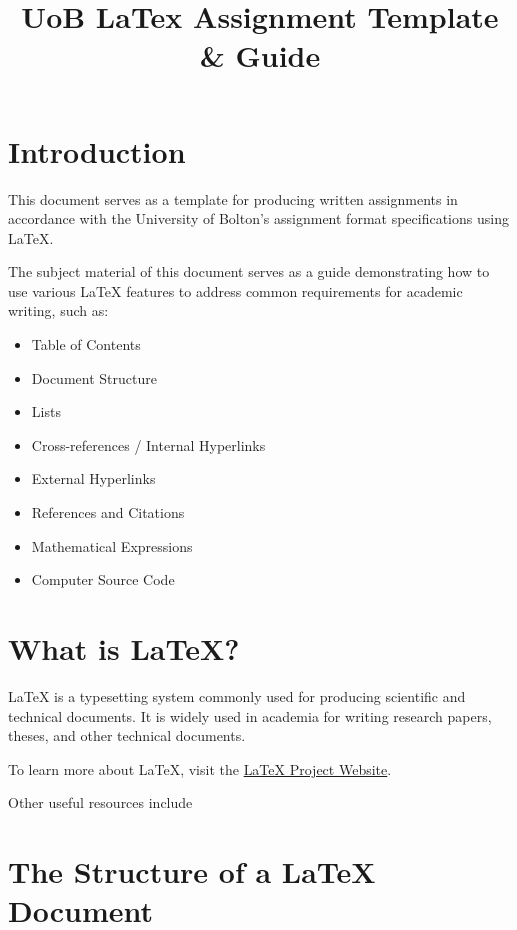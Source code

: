 \documentclass[12pt]{article}
\title{UoB LaTex Assignment Template & Guide}
\begin{document}
  
  \newpage
  \tableofcontents


  \section{Introduction}
  \label{sec:introduction}

  This document serves as a template for producing written assignments in accordance with the University of Bolton's assignment format specifications using LaTeX.

  The subject material of this document serves as a guide demonstrating how to use various LaTeX features to address common requirements for academic writing, such as:

  \begin{itemize}
    \item Table of Contents
    \item Document Structure
    \item Lists
    \item Cross-references / Internal Hyperlinks
    \item External Hyperlinks
    \item References and Citations
    \item Mathematical Expressions
    \item Computer Source Code
  \end{itemize}


  \section{What is LaTeX?}
  \label{sec:what-is-latex}

  LaTeX is a typesetting system commonly used for producing scientific and technical documents. It is widely used in academia for writing research papers, theses, and other technical documents. 

  To learn more about LaTeX, visit the \href{https://www.latex-project.org/}{LaTeX Project Website}. 

  Other useful resources include \cite{mittelbach_2023_the}


  \section{The Structure of a LaTeX Document}
  \label{sec:the-structure-of-a-latex-document}
\end{document}
